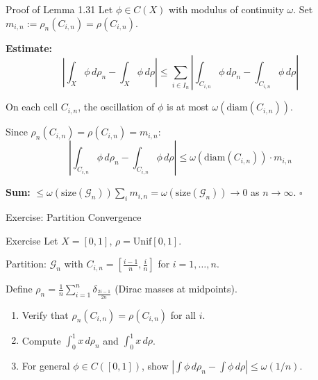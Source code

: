 \documentclass[aspectratio=169]{beamer}
\begin{document}
\begin{frame}{Proof of Lemma 1.31}
Let $\phi \in C(X)$ with modulus of continuity $\omega$. Set $m_{i,n} := \rho_n(C_{i,n}) = \rho(C_{i,n})$.

\vspace{0.2cm}
\textbf{Estimate:}
\[
\left| \int_X \phi \, d\rho_n - \int_X \phi \, d\rho \right| \leq \sum_{i \in I_n} \left| \int_{C_{i,n}} \phi \, d\rho_n - \int_{C_{i,n}} \phi \, d\rho \right|
\]

On each cell $C_{i,n}$, the oscillation of $\phi$ is at most $\omega(\text{diam}(C_{i,n}))$.

Since $\rho_n(C_{i,n}) = \rho(C_{i,n}) = m_{i,n}$:
\[
\left| \int_{C_{i,n}} \phi \, d\rho_n - \int_{C_{i,n}} \phi \, d\rho \right| \leq \omega(\text{diam}(C_{i,n})) \cdot m_{i,n}
\]

\textbf{Sum:} $\displaystyle \leq \omega(\text{size}(\mathcal{G}_n)) \sum_{i} m_{i,n} = \omega(\text{size}(\mathcal{G}_n)) \to 0$ as $n \to \infty$. \hfill $\square$
\end{frame}

\begin{frame}{Exercise: Partition Convergence}
\begin{block}{Exercise}
Let $X = [0,1]$, $\rho = \text{Unif}[0,1]$.

Partition: $\mathcal{G}_n$ with $C_{i,n} = \left[\frac{i-1}{n}, \frac{i}{n}\right]$ for $i = 1, \ldots, n$.

Define $\rho_n = \frac{1}{n} \sum_{i=1}^{n} \delta_{\frac{2i-1}{2n}}$ (Dirac masses at midpoints).
\begin{enumerate}
    \item[(a)] Verify that $\rho_n(C_{i,n}) = \rho(C_{i,n})$ for all $i$.
    \item[(b)] Compute $\int_0^1 x \, d\rho_n$ and $\int_0^1 x \, d\rho$.
    \item[(c)] For general $\phi \in C([0,1])$, show $\left|\int \phi \, d\rho_n - \int \phi \, d\rho\right| \leq \omega(1/n)$.
\end{enumerate}
\end{block}

\begin{center}
\end{center}
\end{frame}
\end{document}
